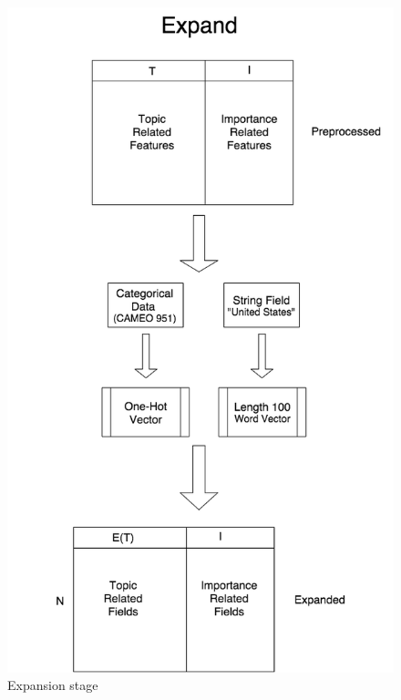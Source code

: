 \begin{figure}[ht]
\vskip 0.2in
\begin{center}
\centerline{\includegraphics[width=\columnwidth]{images/expand_vertical.png}}
\caption{Expansion stage}
\end{center}
\vskip -0.2in
\label{fig:exapand}
\end{figure} 


